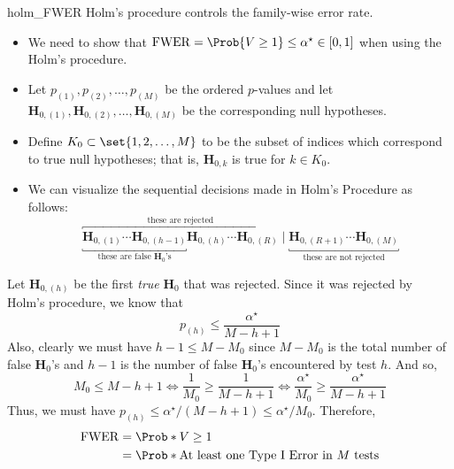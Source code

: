 \begin{Theorem}{}{holm_FWER}
      Holm's procedure controls the family-wise error rate.
\end{Theorem}
\begin{Proof}{ \dagger}{}
      \begin{itemize}
            \item We need to show that $ \FWER=\Prob{V\ge 1}\le \alpha^\star\in[0,1] $ when using the Holm's procedure.
            \item Let $ p_{(1)},p_{(2)},\ldots,p_{(M)} $ be the ordered $ p $-values and let
                  $ \mathbf{H}_{0,(1)},\mathbf{H}_{0,(2)},\ldots,\mathbf{H}_{0,(M)} $ be the corresponding null hypotheses.
            \item Define $ K_0\subset \set{1,2,\ldots,M} $ to be the subset of indices which correspond
                  to true null hypotheses; that is, $ \mathbf{H}_{0,k} $ is true for $ k\in K_0 $.
            \item We can visualize the sequential decisions made in Holm's Procedure as follows:
                  \[ \overbracket{\underbracket{\mathbf{H}_{0,(1)}\cdots\mathbf{H}_{0,(h-1)}}_{\text{these are false $\mathbf{H}_0$'s}}\mathbf{H}_{0,(h)}\cdots \mathbf{H}_{0,(R)}}^{\text{these are rejected}}\mid \underbracket{\mathbf{H}_{0,(R+1)}\cdots\mathbf{H}_{0,(M)}}_{\text{these are not rejected}} \]
      \end{itemize}
      Let $ \mathbf{H}_{0,(h)} $ be the first \emph{true} $ \mathbf{H}_0 $ that was rejected. Since it was rejected by Holm's procedure, we know that
      \[ p_{(h)}\le \frac{\alpha^\star}{M-h+1} \]
      Also, clearly we must have $ h-1\le M-M_0 $ since $ M-M_0 $ is the total number of false $ \mathbf{H}_0 $'s and $ h-1 $ is the number of false
      $ \mathbf{H}_0 $'s encountered by test $ h $. And so,
      \[
            M_0\le M-h+1
            \iff \frac{1}{M_0} \ge \frac{1}{M-h+1}
            \iff \frac{\alpha^\star}{M_0} \ge \frac{\alpha^\star}{M-h+1}
      \]
      Thus, we must have $ p_{(h)}\le \alpha^\star/(M-h+1)\le \alpha^\star/M_0 $. Therefore,
      \begin{align*}
            \FWER
             & =\Prob*{V\ge 1}                                                                                                                    \\
             & =\Prob*{\text{At least one Type I Error in $M$ tests}}                                                                             \\

\end{align*}
\end{Proof}
